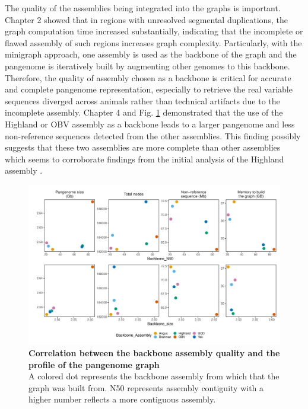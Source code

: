 \documentclass[../main.tex]{subfiles}
\begin{document}
The quality of the assemblies being integrated into the graphs is important. Chapter 2 showed that in regions with unresolved segmental duplications, the graph computation time increased substantially, indicating that the incomplete or flawed assembly of such regions increases graph complexity. Particularly, with the minigraph approach, one assembly is used as the backbone of the graph and the pangenome is iteratively built by augmenting other genomes to this backbone. Therefore, the quality of assembly chosen as a backbone is critical for accurate and complete pangenome representation, especially to retrieve the real variable sequences diverged across animals rather than technical artifacts due to the incomplete assembly. Chapter 4 and Fig. \ref{fig52:backeff}  demonstrated that the use of the Highland or OBV assembly as a backbone leads to a larger pangenome and less non-reference sequences detected from the other assemblies. This finding possibly suggests that these two assemblies are more complete than other assemblies which seems to corroborate findings from the initial analysis of the Highland assembly \citep{rice2020continuous}. 

\begin{figure}[!htb]
   \centering
   \includegraphics[width=\textwidth]{discuss/fig52.pdf}
       \vspace{1mm}
       \caption[Correlation between the backbone assembly quality and the profile of the pangenome graph]{\textbf{Correlation between the backbone assembly quality and the profile of the pangenome graph} \\
       \footnotesize{A colored dot represents the backbone assembly from which that the graph was built from. 
        N50 represents assembly contiguity with a higher number reflects a more contiguous assembly. 
       }}
       \label{fig52:backeff}
\end{figure}
\end{document}
